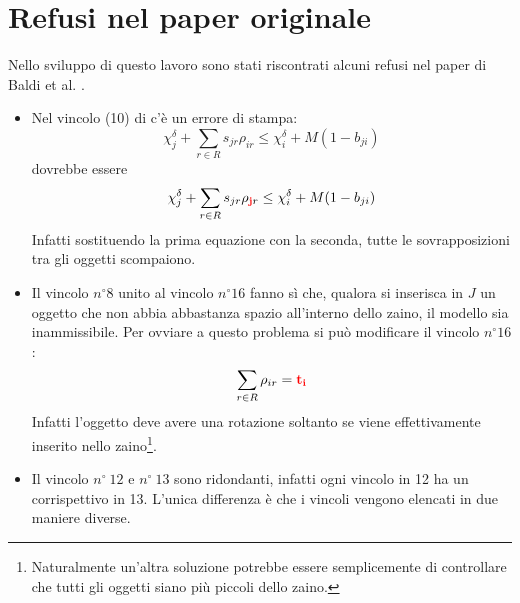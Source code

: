 \documentclass{scrartcl}
\begin{document}
\section{Refusi nel paper originale}
Nello sviluppo di questo lavoro sono stati riscontrati alcuni refusi nel paper di Baldi et al. \cite{Baldi20129802}.
\begin{itemize}
	\item Nel vincolo (10) di \cite{Baldi20129802} c'è un errore di stampa:
	$$
	\chi_j^\delta + \sum_{r\in R} s_{jr}\rho_{ir} \leq \chi_i^\delta + M(1-b_{ji})
	$$
	dovrebbe essere 
	$$
	\chi_j^\delta + \sum_{r\in R} s_{jr}\rho_{\mathbf{\color{red}j}r} \leq \chi_i^\delta + M(1-b_{ji})
	$$
	Infatti sostituendo la prima equazione con la seconda, tutte le sovrapposizioni tra gli oggetti scompaiono.
	\item Il vincolo $n^\circ 8$ unito al vincolo $n^\circ 16$ fanno sì che, qualora si inserisca in $J$ un oggetto che non abbia abbastanza spazio all'interno dello zaino, il modello sia inammissibile. Per ovviare a questo problema si può modificare il vincolo $n^\circ 16$:
	$$
	\sum_{r \in R} \rho_{ir} = \color{red}\mathbf{t_i}
	$$
	Infatti l'oggetto deve avere una rotazione soltanto se viene effettivamente inserito nello zaino\footnote{ 
	Naturalmente un'altra soluzione potrebbe essere semplicemente di controllare che tutti gli oggetti siano più piccoli dello zaino.}. 
	\item Il vincolo $n^\circ\ 12$ e $n^\circ\ 13$ sono ridondanti, infatti ogni vincolo in 12 ha un corrispettivo in 13. L'unica differenza è che i vincoli vengono elencati in due maniere diverse. 
\end{itemize}




\end{document}

